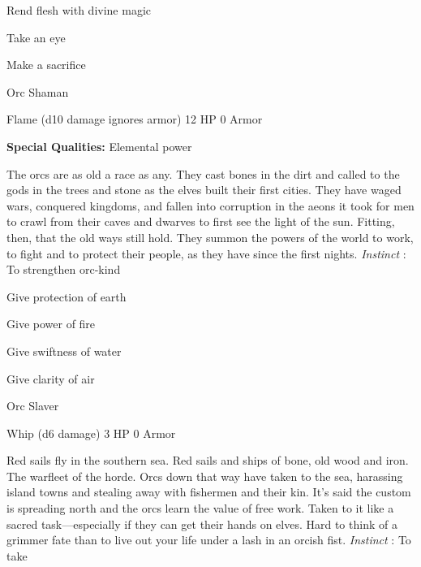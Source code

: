 \startitemize[1,packed]

\item Rend flesh with divine magic

 
\item Take an eye

 
\item Make a sacrifice


\stopitemize
 
\startMonsterName
Orc Shaman	 
\stopMonsterName
 

Flame (d10 damage ignores armor)	12 HP	0 Armor

 


 
\startMonsterQualities
{\bf Special Qualities:}  Elemental power
\stopMonsterQualities
 
\startMonsterDescription
The orcs are as old a race as any. They cast bones in the dirt and called to the gods in the trees and stone as the elves built their first cities. They have waged wars, conquered kingdoms, and fallen into corruption in the aeons it took for men to crawl from their caves and dwarves to first see the light of the sun. Fitting, then, that the old ways still hold. They summon the powers of the world to work, to fight and to protect their people, as they have since the first nights. {\em Instinct} : To strengthen orc-kind
\stopMonsterDescription
 
\startitemize[1,packed]

\item Give protection of earth

 
\item Give power of fire

 
\item Give swiftness of water

 
\item Give clarity of air


\stopitemize
 
\startMonsterName
Orc Slaver	 
\stopMonsterName
 

Whip (d6 damage)	3 HP	0 Armor

 


 
\startMonsterDescription
Red sails fly in the southern sea. Red sails and ships of bone, old wood and iron. The warfleet of the horde. Orcs down that way have taken to the sea, harassing island towns and stealing away with fishermen and their kin. It’s said the custom is spreading north and the orcs learn the value of free work. Taken to it like a sacred task—especially if they can get their hands on elves. Hard to think of a grimmer fate than to live out your life under a lash in an orcish fist. {\em Instinct} : To take
\stopMonsterDescription
 
